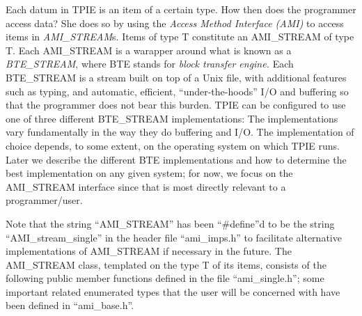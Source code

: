 Each datum in TPIE is an item of a certain type.
How then does the programmer access data? She does so by using the
\emph{Access Method Interface (AMI)} to access items in 
\emph{AMI\_STREAM}s. Items of type T constitute an AMI\_STREAM of 
type T. Each AMI\_STREAM is a warapper around  what is known
as a \emph{BTE\_STREAM}, where BTE stands for \emph{block transfer
engine.} Each BTE\_STREAM is a stream built on top of a Unix file, with 
additional features such as typing,  and automatic, efficient,
``under-the-hoods'' I/O and buffering so that the programmer does
not bear this burden. TPIE can be configured to use one of three
different BTE\_STREAM implementations: The implementations vary
fundamentally in the way they do buffering and I/O. The implementation
of choice depends, to some extent, on the operating system on which 
TPIE runs. Later we describe the different BTE implementations and
how to determine the best implementation on any given system; for now,
we focus on the AMI\_STREAM interface since that is most directly
relevant to a programmer/user.


Note that the string ``AMI\_STREAM'' has
 been ``\#define''d to be the string ``AMI\_stream\_single'' in the
 header file ``ami\_imps.h'' to facilitate alternative implementations
of AMI\_STREAM if necessary in the future.
The AMI\_STREAM class,
templated on the type T of its items,  consists of the following
public member functions defined in the file ``ami\_single.h'';
some important related enumerated types that the user will be
 concerned with have been defined in ``ami\_base.h''.

